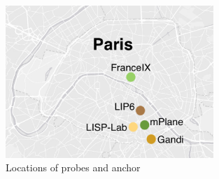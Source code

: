 \begin{figure}[!t]
	\centering
	\includegraphics[width=0.7\textwidth]{Pics/Probes_loc.eps}
	\caption{Locations of probes and anchor}
	\label{Probes_location_2016}
\end{figure}

